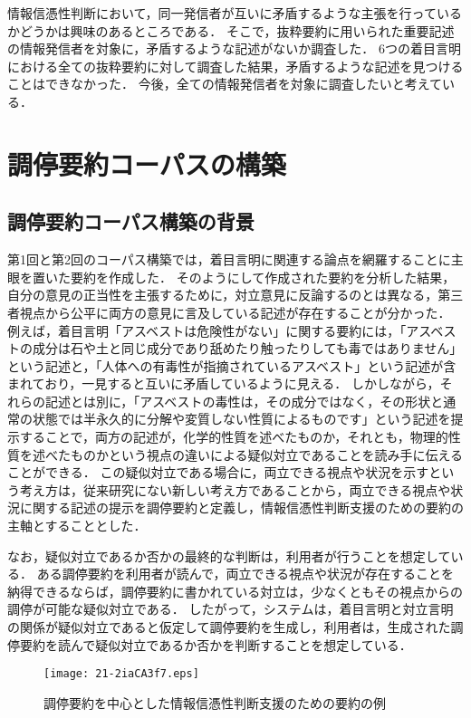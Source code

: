 \documentclass[japanese]{jnlp_1.4}
\begin{document}
情報信憑性判断において，同一発信者が互いに矛盾するような主張を行っているかどうかは興味のあるところである．
そこで，抜粋要約に用いられた重要記述の情報発信者を対象に，矛盾するような記述がないか調査した．
6つの着目言明における全ての抜粋要約に対して調査した結果，矛盾するような記述を見つけることはできなかった．
今後，全ての情報発信者を対象に調査したいと考えている．


\section{調停要約コーパスの構築}
\label{sc:mediatory_summary}

\subsection{調停要約コーパス構築の背景}

第1回と第2回のコーパス構築では，着目言明に関連する論点を網羅することに主眼を置いた要約を作成した．
そのようにして作成された要約を分析した結果，自分の意見の正当性を主張するために，対立意見に反論するのとは異なる，第三者視点から公平に両方の意見に言及している記述が存在することが分かった．
例えば，着目言明「アスベストは危険性がない」に関する要約には，「アスベストの成分は石や土と同じ成分であり舐めたり触ったりしても毒ではありません」という記述と，「人体への有毒性が指摘されているアスベスト」という記述が含まれており，一見すると互いに矛盾しているように見える．
しかしながら，それらの記述とは別に，「アスベストの毒性は，その成分ではなく，その形状と通常の状態では半永久的に分解や変質しない性質によるものです」という記述を提示することで，両方の記述が，化学的性質を述べたものか，それとも，物理的性質を述べたものかという視点の違いによる疑似対立であることを読み手に伝えることができる．
この疑似対立である場合に，両立できる視点や状況を示すという考え方は，従来研究にない新しい考え方であることから，両立できる視点や状況に関する記述の提示を調停要約と定義し，情報信憑性判断支援のための要約の主軸とすることとした．

{なお}，疑似対立であるか否かの最終的な判断は，利用者が行うことを想定している．
ある調停要約を利用者が読んで，両立できる視点や状況が存在することを納得できるならば，調停要約に書かれている対立は，少なくともその視点からの調停が可能な疑似対立である．
したがって，システムは，着目言明と対立言明の関係が疑似対立であると仮定して調停要約を生成し，利用者は，生成された調停要約を読んで疑似対立であるか否かを判断することを想定している．

\begin{figure}[t]
\begin{center}
\texttt{[image: 21-2iaCA3f7.eps]}
\end{center}
\caption{調停要約{を}中心とした情報信憑性判断支援のための要約の例}
\label{fg:mediatory_summary}
\end{figure}
\end{document}
